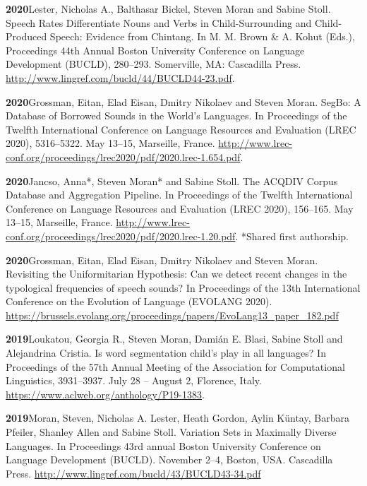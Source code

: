 \documentclass[11pt]{article}
\newcommand{\hangpara}{
 \setlength{\parindent}{0in} %
 \hangindent=0.42in %
}
\begin{document}
\vskip 6pt
\hangpara
{\bf 2020}\hspace{1ex}Lester, Nicholas A., Balthasar Bickel, Steven Moran and Sabine Stoll. Speech Rates Differentiate Nouns and Verbs in Child-Surrounding and Child-Produced Speech: Evidence from Chintang. In M. M. Brown \& A. Kohut (Eds.), Proceedings 44th Annual Boston University Conference on Language Development (BUCLD), 280--293. Somerville, MA: Cascadilla Press. \url{http://www.lingref.com/bucld/44/BUCLD44-23.pdf}.

\vskip 6pt
\hangpara
{\bf 2020}\hspace{1ex}Grossman, Eitan, Elad Eisan, Dmitry Nikolaev and Steven Moran. SegBo: A Database of Borrowed Sounds in the World's Languages. In Proceedings of the Twelfth International Conference on Language Resources and Evaluation (LREC 2020), 5316--5322. May 13--15, Marseille, France. \url{http://www.lrec-conf.org/proceedings/lrec2020/pdf/2020.lrec-1.654.pdf}.

\vskip 6pt
\hangpara
{\bf 2020}\hspace{1ex}Jancso, Anna*, Steven Moran*  and Sabine Stoll. The ACQDIV Corpus Database and Aggregation Pipeline. In Proceedings of the Twelfth International Conference on Language Resources and Evaluation (LREC 2020), 156--165. May 13--15, Marseille, France. \url{http://www.lrec-conf.org/proceedings/lrec2020/pdf/2020.lrec-1.20.pdf}. *Shared first authorship. 

\vskip 6pt
\hangpara
{\bf 2020}\hspace{1ex}Grossman, Eitan, Elad Eisan, Dmitry Nikolaev and Steven Moran. Revisiting the Uniformitarian Hypothesis: Can we detect recent changes in the typological frequencies of speech sounds? In Proceedings of the 13th International Conference on the Evolution of Language (EVOLANG 2020). \url{https://brussels.evolang.org/proceedings/papers/EvoLang13_paper_182.pdf} %

\vskip 6pt
\hangpara
{\bf 2019}\hspace{1ex}Loukatou, Georgia R., Steven Moran, Dami{\'a}n E. Blasi, Sabine Stoll and Alejandrina Cristia. Is word segmentation child's play in all languages? In Proceedings of the 57th Annual Meeting of the Association for Computational Linguistics, 3931--3937. July 28 -- August 2, Florence, Italy.  \url{https://www.aclweb.org/anthology/P19-1383}.

\vskip 6pt
\hangpara
{\bf 2019}\hspace{1ex}Moran, Steven, Nicholas A. Lester, Heath Gordon, Aylin Küntay, Barbara Pfeiler, Shanley Allen and Sabine Stoll. Variation Sets in Maximally Diverse Languages. In Proceedings 43rd annual Boston University Conference on Language Development (BUCLD). November 2--4, Boston, USA. Cascadilla Press. \url{http://www.lingref.com/bucld/43/BUCLD43-34.pdf}
\end{document}
